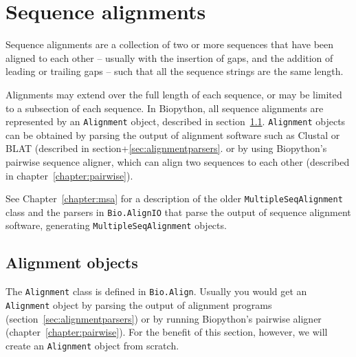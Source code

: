 \chapter{Sequence alignments}
\label{chapter:align}

Sequence alignments are a collection of two or more sequences that have been aligned to each other -- usually with the insertion of gaps, and the addition of leading or trailing gaps -- such that all the sequence strings are the same length.

Alignments may extend over the full length of each sequence, or may be limited to a subsection of each sequence. In Biopython, all sequence alignments are represented by an \verb|Alignment| object, described in section~\ref{sec:alignmentobject}. \verb|Alignment| objects can be obtained by parsing the output of alignment software such as Clustal or BLAT (described in section+\ref{sec:alignmentparsers}. or by using Biopython's pairwise sequence aligner, which can align two sequences to each other (described in chapter~\ref{chapter:pairwise}).

See Chapter~\ref{chapter:msa} for a description of the older \verb|MultipleSeqAlignment| class and the parsers in \verb|Bio.AlignIO| that parse the output of sequence alignment software, generating \verb|MultipleSeqAlignment| objects.

\section{Alignment objects}
\label{sec:alignmentobject}

The \verb|Alignment| class is defined in \verb|Bio.Align|. Usually you would get an \verb|Alignment| object by parsing the output of alignment programs (section~\ref{sec:alignmentparsers}) or by running Biopython's pairwise aligner (chapter~\ref{chapter:pairwise}). For the benefit of this section, however, we will create an \verb|Alignment| object from scratch.

